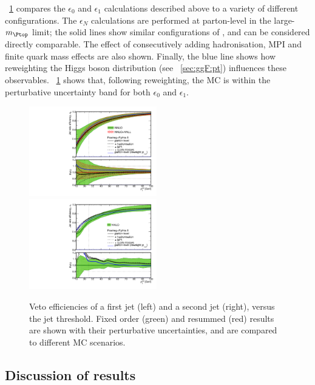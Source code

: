 \Figure~\ref{fig:ggF:jve_compare} compares the $\epsilon_0$ and $\epsilon_1$ calculations 
described above to a variety of different  configurations.
The $\epsilon_N$ calculations are performed at parton-level in the large-$m_{\Ptop}$ 
limit; the solid lines show similar configurations of , 
and can be considered directly comparable. The effect of consecutively adding 
hadronisation, MPI and finite quark mass effects are also shown. Finally, the blue line 
shows how reweighting the Higgs boson \pt distribution (see \Section~\ref{sec:ggF:pt}) 
influences these observables. \Figure~\ref{fig:ggF:jve_compare} shows that, following 
\ptH reweighting, the MC is within the perturbative uncertainty band for both $\epsilon_0$ 
and $\epsilon_1$.

\begin{figure}[t]
	\includegraphics[width=0.495\textwidth]{tex/signal/eps0_jve_compare}
	\hfill
	\includegraphics[width=0.495\textwidth]{tex/signal/eps1_jve_compare}
	\caption{Veto efficiencies of a first jet (left) and a second jet (right), versus the 
	jet \pt threshold. Fixed order (green) and resummed (red) results are shown with their 
	perturbative uncertainties, and are compared to different MC scenarios.}
	\label{fig:ggF:jve_compare}
\end{figure}



\subsection{Discussion of results}

